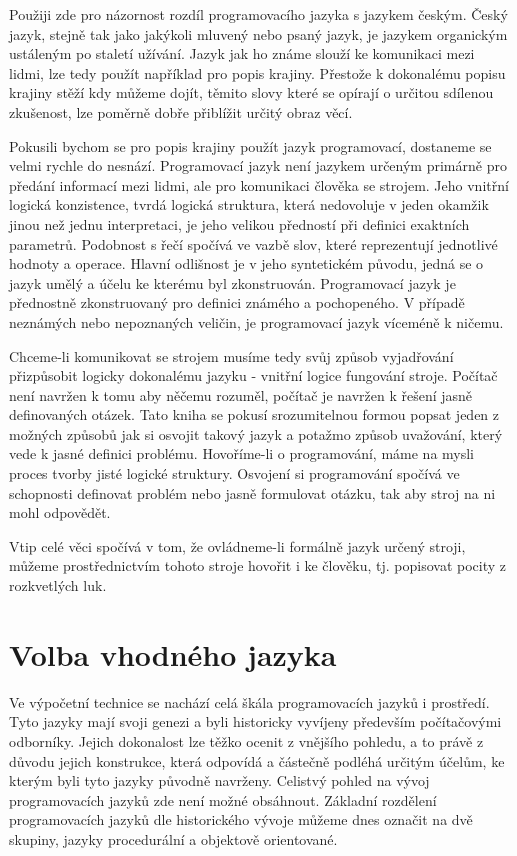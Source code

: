 \documentclass[10pt,twopage]{book}
\newcommand{\oddil}[1]{\section{#1}\label{sec:#1}}
\begin{document}
Použiji zde pro názornost rozdíl programovacího jazyka s jazykem českým. Český jazyk, stejně tak jako jakýkoli mluvený nebo psaný jazyk, je jazykem organickým ustáleným po staletí užívání. Jazyk jak ho známe slouží ke komunikaci mezi lidmi, lze tedy použít například pro popis krajiny. Přestože k dokonalému popisu krajiny stěží kdy můžeme dojít, těmito slovy které se opírají o určitou sdílenou zkušenost, lze poměrně dobře přiblížit určitý obraz věcí.

Pokusili bychom se pro popis krajiny použít jazyk programovací, dostaneme se velmi rychle do nesnází. Programovací jazyk není jazykem určeným primárně pro předání informací mezi lidmi, ale pro komunikaci člověka se strojem. Jeho vnitřní logická konzistence, tvrdá logická struktura, která nedovoluje v jeden okamžik jinou než jednu interpretaci, je jeho velikou předností při definici exaktních parametrů. Podobnost s řečí spočívá ve vazbě slov, které reprezentují jednotlivé hodnoty a operace. Hlavní odlišnost je v jeho syntetickém původu, jedná se o jazyk umělý a účelu ke kterému byl zkonstruován. Programovací jazyk je přednostně zkonstruovaný pro definici známého a pochopeného. V případě neznámých nebo nepoznaných veličin, je programovací jazyk víceméně k ničemu. 

Chceme-li komunikovat se strojem musíme tedy svůj způsob vyjadřování přizpůsobit logicky dokonalému jazyku - vnitřní logice fungování stroje. Počítač není navržen k tomu aby něčemu rozuměl, počítač je navržen k řešení jasně definovaných otázek. Tato kniha se pokusí srozumitelnou formou popsat jeden z možných způsobů jak si osvojit takový jazyk a potažmo způsob uvažování, který vede k jasné definici problému. Hovoříme-li o programování, máme na mysli proces tvorby jisté logické struktury. Osvojení si programování spočívá ve schopnosti definovat problém nebo jasně formulovat otázku, tak aby stroj na ni mohl odpovědět.

Vtip celé věci spočívá v tom, že ovládneme-li formálně jazyk určený stroji, můžeme prostřednictvím tohoto stroje hovořit i ke člověku, tj. popisovat pocity z rozkvetlých luk.

\oddil{Volba vhodného jazyka}


Ve výpočetní technice se nachází celá škála programovacích jazyků i prostředí. Tyto jazyky mají svoji genezi a byli historicky vyvíjeny především počítačovými odborníky. Jejich dokonalost lze těžko ocenit z vnějšího pohledu, a to právě z důvodu jejich konstrukce, která odpovídá a částečně podléhá určitým účelům, ke kterým byli tyto jazyky původně navrženy. Celistvý pohled na vývoj programovacích jazyků zde není možné obsáhnout. Základní rozdělení programovacích jazyků dle historického vývoje můžeme dnes označit na dvě skupiny, jazyky procedurální a objektově orientované.
\end{document}
